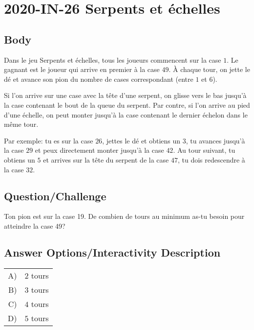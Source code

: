 \documentclass[a4paper,11pt]{report}
\newcommand{\taskGraphicsFolder}{..}
\begin{document}
\section*{\centering{} 2020-IN-26 Serpents et échelles}


\subsection*{Body}

Dans le jeu Serpents et échelles, tous les joueurs commencent sur la case $1$. Le gagnant est le joueur qui arrive en premier à la case $49$. À chaque tour, on jette le dé et avance son pion du nombre de cases correspondant (entre $1$ et $6$).

{\centering%
\par}

Si l’on arrive sur une case avec la tête d’une serpent, on glisse vers le bas jusqu’à la case contenant le bout de la queue du serpent. Par contre, si l’on arrive au pied d’une échelle, on peut monter jusqu’à la case contenant le dernier échelon dans le même tour.

Par exemple: tu es sur la case $26$, jettes le dé et obtiens un $3$, tu avances jusqu’à la case $29$ et peux directement monter jusqu’à la case $42$. Au tour suivant, tu obtiens un $5$ et arrives sur la tête du serpent de la case $47$, tu dois redescendre à la case $32$.

{\em

\subsection*{Question/Challenge}

Ton pion est sur la case 19. De combien de tours au minimum as-tu besoin pour atteindre la case 49?

}\begingroup
\renewcommand{\arraystretch}{1.5}
\subsection*{Answer Options/Interactivity Description}

\begin{tabular}{ @{} r l @{} }
  A) & $2$ tours \\ 
  B) & $3$ tours \\ 
  C) & $4$ tours \\ 
  D) & $5$ tours
\end{tabular}
\end{document}

